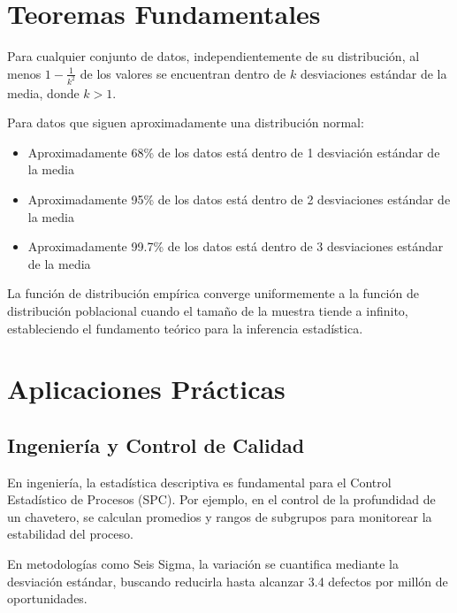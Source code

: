 \section{Teoremas Fundamentales}

\begin{theorem}
Para cualquier conjunto de datos, independientemente de su distribución, al menos $1 - \frac{1}{k^2}$ de los valores se encuentran dentro de $k$ desviaciones estándar de la media, donde $k > 1$.
\end{theorem}

\begin{theorem}
Para datos que siguen aproximadamente una distribución normal:
\begin{itemize}
    \item Aproximadamente 68\% de los datos está dentro de 1 desviación estándar de la media
    \item Aproximadamente 95\% de los datos está dentro de 2 desviaciones estándar de la media
    \item Aproximadamente 99.7\% de los datos está dentro de 3 desviaciones estándar de la media
\end{itemize}
\end{theorem}

\begin{theorem}
La función de distribución empírica converge uniformemente a la función de distribución poblacional cuando el tamaño de la muestra tiende a infinito, estableciendo el fundamento teórico para la inferencia estadística.
\end{theorem}

\section{Aplicaciones Prácticas}

\subsection{Ingeniería y Control de Calidad}

En ingeniería, la estadística descriptiva es fundamental para el Control Estadístico de Procesos (SPC). Por ejemplo, en el control de la profundidad de un chavetero, se calculan promedios y rangos de subgrupos para monitorear la estabilidad del proceso.

\begin{remark}
En metodologías como Seis Sigma, la variación se cuantifica mediante la desviación estándar, buscando reducirla hasta alcanzar 3.4 defectos por millón de oportunidades.
\end{remark}

